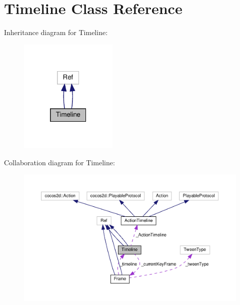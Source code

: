 \hypertarget{classTimeline}{}\section{Timeline Class Reference}
\label{classTimeline}


Inheritance diagram for Timeline\+:
\nopagebreak
\begin{figure}[H]
\begin{center}
\leavevmode
\includegraphics[width=133pt]{classTimeline__inherit__graph}
\end{center}
\end{figure}


Collaboration diagram for Timeline\+:
\nopagebreak
\begin{figure}[H]
\begin{center}
\leavevmode
\includegraphics[width=350pt]{classTimeline__coll__graph}
\end{center}
\end{figure}
